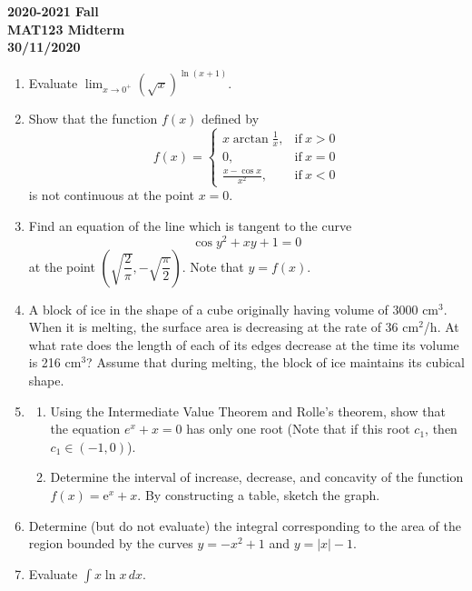 \documentclass[a4paper, 12pt]{article}
\begin{document}
\pagestyle{empty}

\begin{center}
\textbf{2020-2021 Fall\\MAT123 Midterm\\30/11/2020}
\end{center}

\begin{enumerate}[leftmargin=*,label=\textbf{\arabic*.}]
\item Evaluate $\displaystyle\lim_{x\to0^+}(\sqrt x)^{\ln(x+1)}$.

\item Show that the function $f(x)$ defined by
\[
f(x)=
\begin{cases}
\displaystyle x\arctan\frac{1}{x},&\text{if}\ x>0\\[1em]
0,&\text{if}\ x=0\\[1em]
\displaystyle \frac{x-\cos x}{x^2},&\text{if}\ x<0
\end{cases}
\]
is not continuous at the point $x=0$.

\item Find an equation of the line which is tangent to the curve
\[\cos y^2+xy+1=0\]
at the point $\left(\sqrt{\dfrac{2}{\pi}},-\sqrt{\dfrac{\pi}{2}} \right)$. Note that $y=f(x)$.

\item A block of ice in the shape of a cube originally having volume of $3000$ cm$^3$. When it is melting, the surface area is decreasing at the rate of 36 cm$^2$/h. At what rate does the length of each of its edges decrease at the time its volume is 216 cm$^3$? Assume that during melting, the block of ice maintains its cubical shape.

\item \begin{enumerate}[leftmargin=*,label=\textbf{\alph*.}]
\item Using the Intermediate Value Theorem and Rolle’s theorem, show that the equation $e^x + x = 0$ has only one root (Note that if this root $c_1$, then $c_1\in(-1,0)$).
\item Determine the interval of increase, decrease, and concavity of the function $f(x)=\mathrm e^x+x$. By constructing a table, sketch the graph.
\end{enumerate}

\item Determine (but do not evaluate) the integral corresponding to the area of the region bounded by the curves $y=-x^2+1$ and $y =|x|-1$.

\item Evaluate $\displaystyle\int x\ln x\,dx$.
\end{enumerate}
\end{document}
